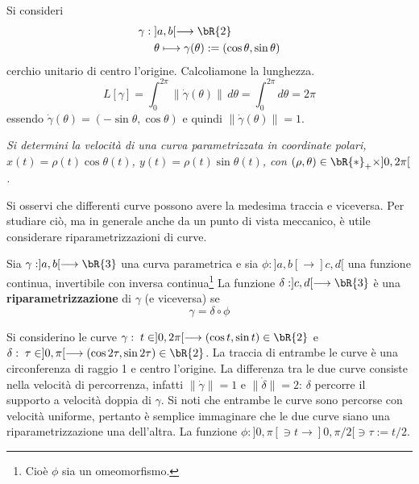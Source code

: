 \begin{example}
  Si consideri 
  \[\begin{aligned}
    \gamma: & \; ]a,b[ \longrightarrow \bR{2}\\
    &\;  \theta\longmapsto \gamma(\theta):= (\cos\theta,\sin\theta)
  \end{aligned}\]
  cerchio unitario di centro l'origine. Calcoliamone la lunghezza.
  \[
    L[\gamma] = \int_0^{2\pi} \|\dot\gamma(\theta)\|\, d\theta = \int_0^{2\pi} 
d\theta = 2\pi
  \]
  essendo $\dot\gamma(\theta) = (-\sin\theta,\cos\theta)$ e quindi 
$\|\dot\gamma(\theta)\|=1$.
\end{example}

\begin{exercise}
  {\it Si determini la velocit\`a di una curva parametrizzata in coordinate 
polari, 
  $x(t)= \rho(t)\cos\theta(t)$, $y(t)= \rho(t)\sin\theta(t)$, con 
$(\rho,\theta)\in \bR{*}_+\times]0,2\pi[$.}
\end{exercise}

Si osservi che differenti curve possono avere la medesima traccia e viceversa. 
Per studiare ci\`o, ma in generale anche da un punto di vista meccanico, \`e 
utile considerare riparametrizzazioni di curve. 
\begin{definition}
  Sia $\gamma:]a,b[\longrightarrow \bR{3}$ una curva parametrica e sia 
  $\phi:]a,b[ \longrightarrow]c,d[$ una funzione continua, invertibile con 
  inversa continua\footnote{Cio\`e $\phi$ sia un omeomorfismo.} La funzione
  $\delta: ]c,d[\longrightarrow\bR{3}$ \`e una {\bf riparametrizzazione} di 
$\gamma$
  (e viceversa) se 
  \[
    \gamma = \delta\circ\phi
  \]
  
\begin{figure}[h!]
\begin{center}
{\small
{}
}
\end{center}
\end{figure}
  
\end{definition}
\begin{example}
  Si considerino le curve $\gamma: \;t\in]0,2\pi[\longrightarrow (\cos t,\sin 
t)\in\bR{2}$ 
  e $\delta:\;\tau\in ]0,\pi[\longrightarrow (\cos2\tau,\sin2\tau)\in\bR{2}$. La 
traccia di 
  entrambe le curve \`e una circonferenza di raggio 1 e centro l'origine. La 
differenza 
  tra le due curve consiste nella velocit\`a di percorrenza, infatti 
$\|\dot\gamma\|=1$
  e $\|\dot \delta\|=2$: $\delta$ percorre il supporto a velocit\`a doppia di 
$\gamma$.
  Si noti che entrambe le curve sono percorse con velocit\`a uniforme, pertanto 
\`e
  semplice immaginare che le due curve siano una riparametrizzazione una 
dell'altra.
  La funzione $\phi:]0,\pi[\ni t \longrightarrow ]0,\pi/2[\ni \tau:=t/2$.
\end{example}

